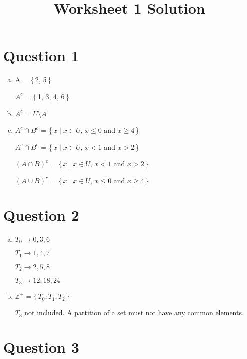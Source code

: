 \documentclass[12pt]{article}
\begin{document}
\title{Worksheet 1 Solution}
\maketitle

\section*{Question 1}

\begin{enumerate}[a)]
    \item
        A = \{\,2, 5\,\}

        $A^c$ = \{\,1, 3, 4, 6\,\}

    \bigskip

    \item
        $A^c$ = $U \setminus A$

    \bigskip

    \item
        $A^c \cap B^c$ = \{\,$x \mid x \in U$, $x \leq 0$ and $x \geq 4$\,\}

        $A^c \cap B^c$ = \{\,$x \mid x \in U$, $x < 1$ and $x > 2$\,\}

        $(A \cap B)^c$ = \{\,$x \mid x \in U$, $x < 1$ and $x > 2$\,\}

        $(A \cup B)^c$ = \{\,$x \mid x \in U$, $x \leq 0$ and $x \geq 4$\,\}
\end{enumerate}


\section*{Question 2}


\begin{enumerate}[a)]
    \item
        $T_0 \to 0,3,6$

        $T_1 \to 1,4,7$

        $T_2 \to 2,5,8$

        $T_3 \to 12,18,24$

    \item
        $\mathbb{Z}^+ = \{\,T_0, T_1, T_2\,\}$

        \bigskip

        $T_3$ not included. A partition of a set must not have any common elements.

\end{enumerate}

\section*{Question 3}
\end{document}
